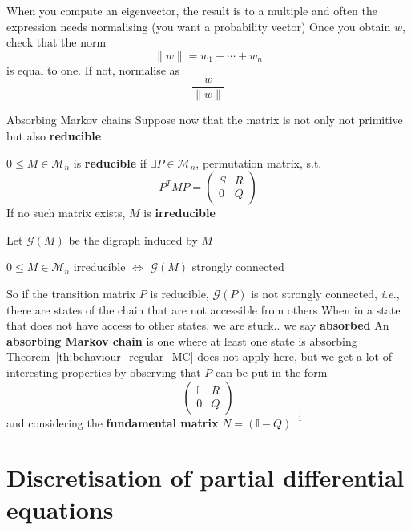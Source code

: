 \documentclass{beamer}
\def\II{\mathbb{I}}
\def\G{\mathcal{G}}
\def\M{\mathcal{M}}
\def\ie{\emph{i.e.}}
\def\defword#1{\textbf{#1}}
\begin{document}
\begin{frame}
When you compute an eigenvector, the result is to a multiple and often the expression needs normalising (you want a probability vector)
\vfill
Once you obtain $w$, check that the norm 
\[
\|w\|=w_1+\cdots+w_n
\] 
is equal to one. If not, normalise as 
\[
\frac{w}{\|w\|}
\]
\end{frame}


\begin{frame}{Absorbing Markov chains}
Suppose now that the matrix is not only not primitive but also \defword{reducible}
\vfill
\begin{definition}
$0\leq M\in\M_n$ is \defword{reducible} if $\exists P\in\M_n$, permutation matrix, s.t.
\[
P^TMP =
\begin{pmatrix}
S & R \\ 0 & Q
\end{pmatrix}
\]
If no such matrix exists, $M$ is \defword{irreducible}
\end{definition}
\vfill
Let $\G(M)$ be the digraph induced by $M$
\begin{theorem}
$0\leq M\in\M_n$ irreducible $\iff$ $\G(M)$ strongly connected
\end{theorem}
\end{frame}

\begin{frame}
So if the transition matrix $P$ is reducible, $\G(P)$ is not strongly connected, \ie, there are states of the chain that are not accessible from others
\vfill
When in a state that does not have access to other states, we are stuck.. we say \defword{absorbed}
\vfill
An \defword{absorbing Markov chain} is one where at least one state is absorbing
\vfill
Theorem~\ref{th:behaviour_regular_MC} does not apply here, but we get a lot of interesting properties by observing that $P$ can be put in the form
\[
\begin{pmatrix}
\II& R \\ 0 & Q
\end{pmatrix}
\]
and considering the \defword{fundamental matrix} $N=(\II-Q)^{-1}$
\end{frame}

\section{Discretisation of partial differential equations}
\label{sec:discretisation_PDEs}
\end{document}
